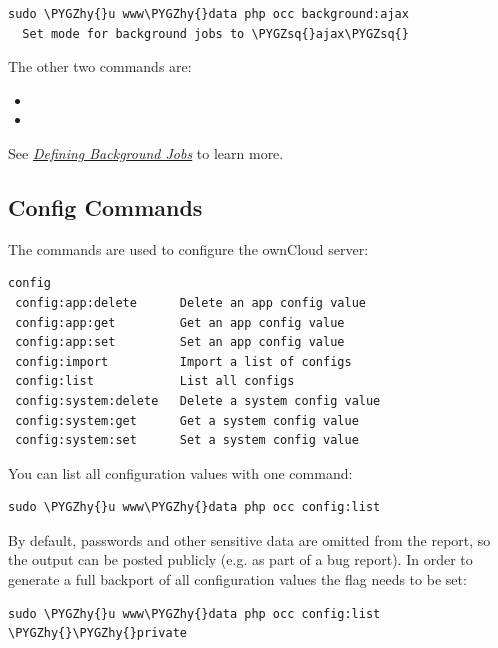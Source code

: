 \documentclass[letterpaper,10pt,english]{sphinxmanual}
\def\PYGZhy{\char`\-}
\def\PYGZsq{\char`\'}
\renewcommand\PYGZsq{\textquotesingle}
\begin{document}
\begin{Verbatim}[commandchars=\\\{\}]
sudo \PYGZhy{}u www\PYGZhy{}data php occ background:ajax
  Set mode for background jobs to \PYGZsq{}ajax\PYGZsq{}
\end{Verbatim}

The other two commands are:
\begin{itemize}
\item {} 

\item {} 

\end{itemize}

See {\hyperref[configuration_server/background_jobs_configuration::doc]{\emph{\emph{Defining Background Jobs}}}} to learn more.


\subsection{Config Commands}
\label{configuration_server/occ_command:config-commands-label}\label{configuration_server/occ_command:config-commands}
The  commands are used to configure the ownCloud server:

\begin{Verbatim}[commandchars=\\\{\}]
config
 config:app:delete      Delete an app config value
 config:app:get         Get an app config value
 config:app:set         Set an app config value
 config:import          Import a list of configs
 config:list            List all configs
 config:system:delete   Delete a system config value
 config:system:get      Get a system config value
 config:system:set      Set a system config value
\end{Verbatim}

You can list all configuration values with one command:

\begin{Verbatim}[commandchars=\\\{\}]
sudo \PYGZhy{}u www\PYGZhy{}data php occ config:list
\end{Verbatim}

By default, passwords and other sensitive data are omitted from the report, so
the output can be posted publicly (e.g. as part of a bug report). In order to
generate a full backport of all configuration values the  flag
needs to be set:

\begin{Verbatim}[commandchars=\\\{\}]
sudo \PYGZhy{}u www\PYGZhy{}data php occ config:list \PYGZhy{}\PYGZhy{}private
\end{Verbatim}
\end{document}
